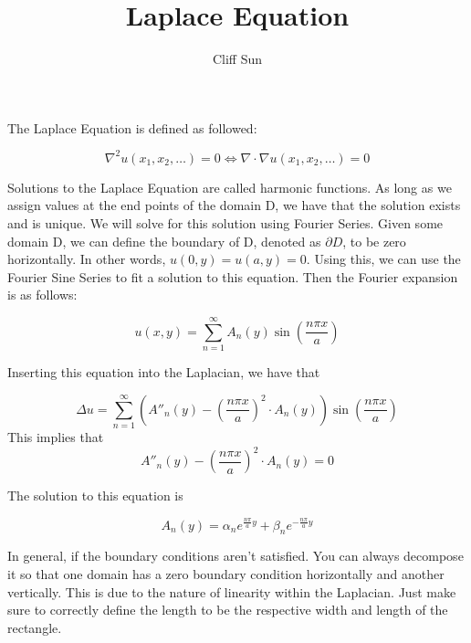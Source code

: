 \documentclass{article}
\title{Laplace Equation}
\author{Cliff Sun}
\begin{document}
\maketitle

The Laplace Equation is defined as followed:

\begin{equation}
    \nabla^2 u(x_1,x_2,\dots) = 0 \iff \nabla \cdot \nabla u(x_1,x_2,\dots) = 0
\end{equation}

Solutions to the Laplace Equation are called harmonic functions. As long as we assign values at the end points of the domain D, we have that the solution exists and is unique. We will
solve for this solution using Fourier Series. Given some domain D, we can define the boundary of D, denoted as $\partial D$, to be zero horizontally. In other words, $u(0,y) = u(a,y) = 0$. Using this, we can use the 
Fourier Sine Series to fit a solution to this equation. Then the Fourier expansion is as follows:

\begin{equation}
    u(x,y) = \sum_{n=1}^{\infty}A_n(y)\sin(\frac{n\pi x}{a})
\end{equation}

Inserting this equation into the Laplacian, we have that 

\begin{equation}
    \Delta u = \sum_{n = 1}^{\infty} (A''_n(y) - (\frac{n \pi x}{a})^2\cdot A_n(y))\sin(\frac{n\pi x}{a})
\end{equation}
This implies that 
\begin{equation}
    A''_n(y) - (\frac{n \pi x}{a})^2\cdot A_n(y) = 0
\end{equation}

The solution to this equation is 

\begin{equation}
    A_n(y) = \alpha_n e^{\frac{n\pi}{a}y} + \beta_n e^{-\frac{n\pi}{a}y}
\end{equation}

In general, if the boundary conditions aren't satisfied. You can always decompose it so that one domain has a zero boundary condition horizontally and another vertically.
This is due to the nature of linearity within the Laplacian. Just make sure to correctly define the length to be the respective width and length of the rectangle. 
\end{document}
